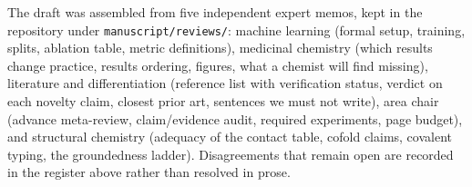 The draft was assembled from five independent expert memos, kept in the repository under
\texttt{manuscript/reviews/}: machine learning (formal setup, training, splits, ablation table,
metric definitions), medicinal chemistry (which results change practice, results ordering, figures,
what a chemist will find missing), literature and differentiation (reference list with verification
status, verdict on each novelty claim, closest prior art, sentences we must not write), area chair
(advance meta-review, claim/evidence audit, required experiments, page budget), and structural
chemistry (adequacy of the contact table, cofold claims, covalent typing, the groundedness ladder).
Disagreements that remain open are recorded in the register above rather than resolved in prose.
